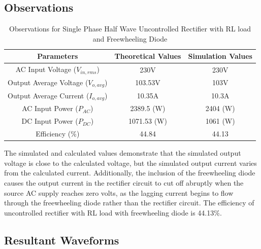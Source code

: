 \subsection{Observations}

\begin{table}[h]
    \renewcommand{\arraystretch}{1.3}
    \label{table_observation_3}
    \centering
    \begin{tabular}{|c|c|c|}
        \hline
        Parameters                              & Theoretical Values & Simulation Values \\
        \hline
        \hline
        AC Input Voltage ($ V_{in,rms} $)       & 230V               & 230V              \\
        \hline
        Output Average Voltage ($ V_{o,avg} $)  & 103.53V            & 103V              \\
        \hline
        Output Average Current ($ I_{o,avg}  $) & 10.35A             & 10.3A             \\
        \hline
        AC Input Power ($ P_{AC}  $)            & 2389.5 (W)         & 2404 (W)          \\
        \hline
        DC Input Power ($ P_{DC}  $)            & 1071.53 (W)        & 1061 (W)          \\
        \hline
        Efficiency (\%)                         & 44.84              & 44.13              \\
        \hline
    \end{tabular}
    \caption{Observations for Single Phase Half Wave Uncontrolled Rectifier with RL load and Freewheeling Diode}

\end{table}



The simulated and calculated values demonstrate that the simulated output voltage is close to the calculated voltage, but the simulated output current varies from the calculated current. Additionally, the inclusion of the freewheeling diode causes the output current in the rectifier circuit to cut off abruptly when the source AC supply reaches zero volts, as the lagging current begins to flow through the freewheeling diode rather than the rectifier circuit.
The efficiency of uncontrolled rectifier with RL load with freewheeling diode is 44.13\%.

\pagebreak

\subsection{Resultant Waveforms}


